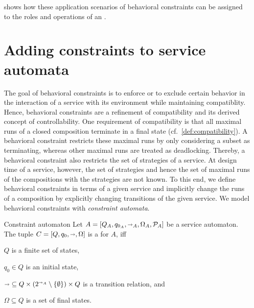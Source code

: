  shows how these application scenarios of behavioral constraints  can be assigned to the roles and operations of an .





\section{Adding constraints to service automata}
\label{sect:validation_sa}

The goal of behavioral constraints is to enforce or to exclude certain behavior in the interaction of a service with its environment while maintaining compatiblity. Hence, behavioral constraints are a refinement of compatibility and its derived concept of controllability. One requirement of compatibility is that all maximal runs of a closed composition terminate in a final state (cf.~\autoref{def:compatibility}). A behavioral constraint restricts these maximal runs by only considering a subset as terminating, whereas other maximal runs are treated as deadlocking. Thereby, a behavioral constraint also restricts the set of strategies of a service. At design time of a service, however, the set of strategies and hence the set of maximal runs of the compositions with the strategies are not known. To this end, we define behavioral constraints in terms of a given service and implicitly change the runs of a composition by explicitly changing transitions of the given service. We model behavioral constraints with \emph{constraint automata}.

\begin{definition}{Constraint automaton}
%
\label{def:constraint}%
Let $A=[Q_{A},q_{0_{A}},{\shortrightarrow}_{A},\Omega_{A},\mathcal{P}_{A}]$ be a service automaton. The tuple $C=[Q,q_{0},{\shortrightarrow},\Omega]$ is a  for $A$, iff
\begin{myenumerate}
\item $Q$ is a finite set of states,
\item $q_{0}\in Q$ is an initial state,
\item ${\shortrightarrow}\subseteq Q\times (2^{{\shortrightarrow}_{A}}\setminus\{\emptyset\}) \times Q$ is a transition relation, and
\item $\Omega\subseteq Q$ is a set of final states.
\end{myenumerate}
\end{definition}

